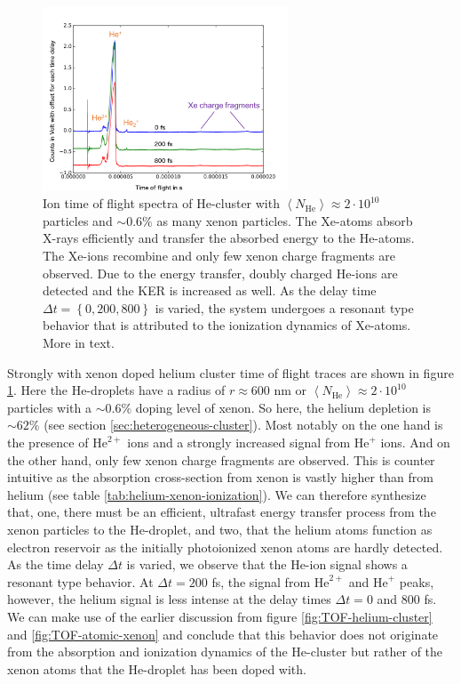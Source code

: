 \begin{figure}
	\centering
		\includegraphics[width=0.65\textwidth]{images/results/TOF-helium-xenon-cluster-60.png}
	\caption[TOF spectra of HeXe-cluster with $\sim 0.6\%$ Xe-doping at various delays $\Delta t$.]{Ion time of flight spectra of He-cluster with $\left\langle N_{\text{He}}\right\rangle\approx 2\cdot 10^{10}$ particles and $\sim 0.6\%$ as many xenon particles. The Xe-atoms absorb X-rays efficiently and transfer the absorbed energy to the He-atoms. The Xe-ions recombine and only few xenon charge fragments are observed. Due to the energy transfer, doubly charged He-ions are detected and the KER is increased as well. As the delay time $\Delta t=\left\{0,200,800\right\}$ is varied, the system undergoes a resonant type behavior that is attributed to the ionization dynamics of Xe-atoms. More in text.}
	\label{fig:TOF-helium-xenon-cluster-60}
\end{figure}
Strongly with xenon doped helium cluster time of flight traces are shown in figure \ref{fig:TOF-helium-xenon-cluster-60}. Here the He-droplets have a radius of $r\approx 600$ nm or $\left\langle N_{\text{He}}\right\rangle\approx 2\cdot 10^{10}$ particles with a $\sim 0.6\%$ doping level of xenon. So here, the helium depletion is $\sim 62\%$ (see section \ref{sec:heterogeneous-cluster}). Most notably on the one hand is the presence of $\text{He}^{2+}$ ions and a strongly increased signal from $\text{He}^{+}$ ions. And on the other hand, only few xenon charge fragments are observed. This is counter intuitive as the absorption cross-section from xenon is vastly higher than from helium (see table \ref{tab:helium-xenon-ionization}). We can therefore synthesize that, one, there must be an efficient, ultrafast energy transfer process from the xenon particles to the He-droplet, and two, that the helium atoms function as electron reservoir as the initially photoionized xenon atoms are hardly detected. As the time delay $\Delta t$ is varied, we observe that the He-ion signal shows a resonant type behavior. At $\Delta t = 200$ fs, the signal from $\text{He}^{2+}$ and $\text{He}^{+}$ peaks, however, the helium signal is less intense at the delay times $\Delta t = 0$ and 800 fs. We can make use of the earlier discussion from figure \ref{fig:TOF-helium-cluster} and \ref{fig:TOF-atomic-xenon} and conclude that this behavior does not originate from the absorption and ionization dynamics of the He-cluster but rather of the xenon atoms that the He-droplet has been doped with.\\
